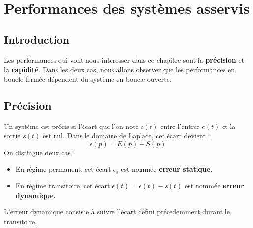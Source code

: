 \chapter[Performances des systèmes]
{Performances des systèmes asservis\label{chap-perf}}
\minitoc
\newpage
\section{Introduction}
Les performances qui vont nous interesser dans 
ce chapitre sont la \textbf{précision} et la \textbf{rapidité}.
Dans les deux cas, nous allons observer que les performances
en boucle fermée dépendent du système en boucle ouverte. 
\section{Précision}
Un système est précis si l'écart que l'on note $\epsilon(t)$ 
entre l'entrée $e(t)$ et la sortie $s(t)$ est nul.
Dans le domaine de Laplace, cet écart devient :
\[
\epsilon(p)=E(p)-S(p)
\]
On distingue deux cas :
\begin{itemize}
    \item En régime permanent, cet écart $\epsilon_s$ est nommée 
		  \textbf{erreur statique. }
    \item En régime transitoire, cet écart $\epsilon(t)=e(t)-s(t)$ est 
		  nommée \textbf{erreur dynamique.}
\end{itemize}
L'erreur dynamique consiste à suivre l'écart défini précedemment durant 
le transitoire.

